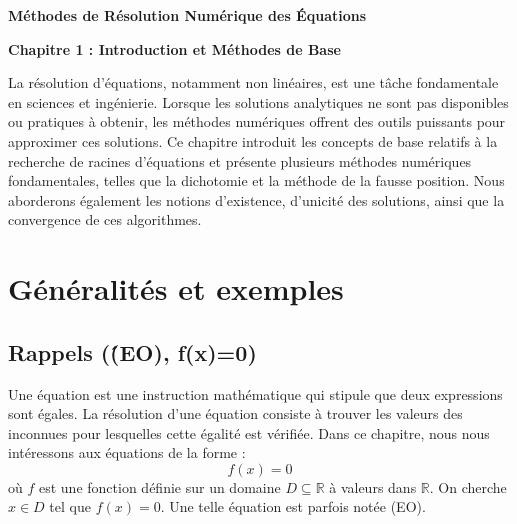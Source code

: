 
\sloppy


\begin{center}
\textbf{\Large Méthodes de Résolution Numérique des Équations}

\vspace{0.5em}

\textbf{\large Chapitre 1 : Introduction et Méthodes de Base}
\end{center}

\vspace{1em}

La résolution d'équations, notamment non linéaires, est une tâche fondamentale en sciences et ingénierie. Lorsque les solutions analytiques ne sont pas disponibles ou pratiques à obtenir, les méthodes numériques offrent des outils puissants pour approximer ces solutions. Ce chapitre introduit les concepts de base relatifs à la recherche de racines d'équations et présente plusieurs méthodes numériques fondamentales, telles que la dichotomie et la méthode de la fausse position. Nous aborderons également les notions d'existence, d'unicité des solutions, ainsi que la convergence de ces algorithmes.

\section{Généralités et exemples}

\subsection{Rappels (\'(EO), f(x)=0)}
Une équation est une instruction mathématique qui stipule que deux expressions sont égales. La résolution d'une équation consiste à trouver les valeurs des inconnues pour lesquelles cette égalité est vérifiée.
Dans ce chapitre, nous nous intéressons aux équations de la forme :
\[ f(x) = 0 \]
où $f$ est une fonction définie sur un domaine $D \subseteq \mathbb{R}$ à valeurs dans $\mathbb{R}$. On cherche $x \in D$ tel que $f(x)=0$. Une telle équation est parfois notée (EO).

